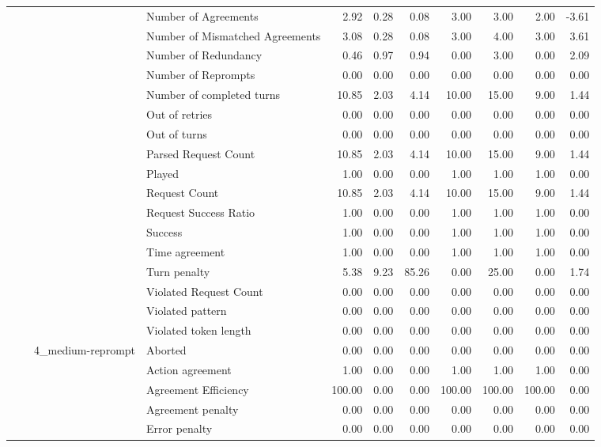 \begin{tabular}{llllrrrrrrr}
 &  &  & Number of Agreements & 2.92 & 0.28 & 0.08 & 3.00 & 3.00 & 2.00 & -3.61 \\
 &  &  & Number of Mismatched Agreements & 3.08 & 0.28 & 0.08 & 3.00 & 4.00 & 3.00 & 3.61 \\
 &  &  & Number of Redundancy & 0.46 & 0.97 & 0.94 & 0.00 & 3.00 & 0.00 & 2.09 \\
 &  &  & Number of Reprompts & 0.00 & 0.00 & 0.00 & 0.00 & 0.00 & 0.00 & 0.00 \\
 &  &  & Number of completed turns & 10.85 & 2.03 & 4.14 & 10.00 & 15.00 & 9.00 & 1.44 \\
 &  &  & Out of retries & 0.00 & 0.00 & 0.00 & 0.00 & 0.00 & 0.00 & 0.00 \\
 &  &  & Out of turns & 0.00 & 0.00 & 0.00 & 0.00 & 0.00 & 0.00 & 0.00 \\
 &  &  & Parsed Request Count & 10.85 & 2.03 & 4.14 & 10.00 & 15.00 & 9.00 & 1.44 \\
 &  &  & Played & 1.00 & 0.00 & 0.00 & 1.00 & 1.00 & 1.00 & 0.00 \\
 &  &  & Request Count & 10.85 & 2.03 & 4.14 & 10.00 & 15.00 & 9.00 & 1.44 \\
 &  &  & Request Success Ratio & 1.00 & 0.00 & 0.00 & 1.00 & 1.00 & 1.00 & 0.00 \\
 &  &  & Success & 1.00 & 0.00 & 0.00 & 1.00 & 1.00 & 1.00 & 0.00 \\
 &  &  & Time agreement & 1.00 & 0.00 & 0.00 & 1.00 & 1.00 & 1.00 & 0.00 \\
 &  &  & Turn penalty & 5.38 & 9.23 & 85.26 & 0.00 & 25.00 & 0.00 & 1.74 \\
 &  &  & Violated Request Count & 0.00 & 0.00 & 0.00 & 0.00 & 0.00 & 0.00 & 0.00 \\
 &  &  & Violated pattern & 0.00 & 0.00 & 0.00 & 0.00 & 0.00 & 0.00 & 0.00 \\
 &  &  & Violated token length & 0.00 & 0.00 & 0.00 & 0.00 & 0.00 & 0.00 & 0.00 \\
\cline{3-11}
 &  & \multirow[t]{27}{*}{4_medium-reprompt} & Aborted & 0.00 & 0.00 & 0.00 & 0.00 & 0.00 & 0.00 & 0.00 \\
 &  &  & Action agreement & 1.00 & 0.00 & 0.00 & 1.00 & 1.00 & 1.00 & 0.00 \\
 &  &  & Agreement Efficiency & 100.00 & 0.00 & 0.00 & 100.00 & 100.00 & 100.00 & 0.00 \\
 &  &  & Agreement penalty & 0.00 & 0.00 & 0.00 & 0.00 & 0.00 & 0.00 & 0.00 \\
 &  &  & Error penalty & 0.00 & 0.00 & 0.00 & 0.00 & 0.00 & 0.00 & 0.00 \\

\end{tabular}
